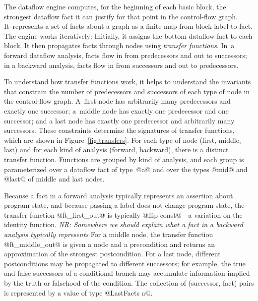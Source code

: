 \documentclass[blockstyle,preprint,nocopyrightspace]{sigplanconf}
\newcommand{\authornote}[1]{{\em #1}}
\newcommand{\norman}[1]{\authornote{NR: #1}}
\let\remark\norman
\newcommand\figref[1]{Figure~\ref{fig:#1}}
\begin{document}
The dataflow engine computes, for the beginning of each basic block,
the strongest dataflow fact it can justify for that point in the
control-flow graph.
It~represents a set of facts about a graph as a finite map from block
label to fact. 
The engine works iteratively:
Initially, it assigns the bottom dataflow fact to each block.
It then propagates facts through nodes using \emph{transfer functions}.
In~a forward dataflow analysis, facts flow in from predecessors and
out to successors; in a backward analysis,
facts flow in from successors and
out to predecessors.

To understand how transfer functions work, it helps to understand the
invariants that constrain the number of predecessors and successors of
each type of node in the control-flow graph.
A~first node has arbitrarily many predecessors and exactly one
successor;
a~middle node has exactly one predecessor and one successor;
and a last node has exactly one predecessor and arbitrarily many
successors. 
These constraints determine the signatures of transfer functions,
which are shown in \figref{transfers}.
For each type of node (first, middle, last) and for each kind of
analysis (forward, backward), there is a distinct transfer function.
Functions are grouped by kind of analysis, and each group is
parameterized over a dataflow fact of type~@a@ and over the types
@mid@ and @last@ of middle and last nodes.


Because a fact in a forward analysis typically represents an assertion
about program state, and because passing a label does not change
program state, the transfer function @ft_first_out@ is typically 
@flip const@---a variation on
the
identity function.
\remark{Somewhere we should explain what a fact in a backward analysis
typically represents}
For a middle node, the transfer function @ft_middle_out@ is given a
node and a precondition and returns an approximation of the strongest
postcondition. 
For a last node, different postconditions may be propagated to
different successors; for example, the true and false successors of a
conditional branch may accumulate information implied by the truth or
falsehood of the condition.
The collection of (successor, fact) pairs is represented by a value of
type @LastFacts a@.
\end{document}

